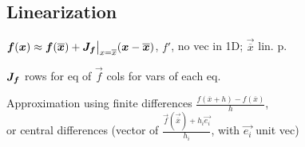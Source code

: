 \subsection{Linearization}
$\bm{f}(\bm{x}) \approx \bm{f}(\bm{\overline{x}}) + \bm{J}_{\bm{f}} \big|_{x = \overline{x}}(\bm{x} - \bm{\overline{x}})$, $f'$, no vec in 1D; $\vec{\overline{x}}$ lin. p.

\shortdefinition[Jac.] $\bm{J}_{\bm{f}}$ rows for eq of $\vec{f}$ cols for vars of each eq.

Approximation using finite differences $\frac{f(\overline{x} + h) - f(\overline{x})}{h}$,\\
or central differences (vector of $\frac{\vec{f}(\vec{\overline{x}}) + h_i \vec{e_i}}{h_i}$, with $\vec{e_i}$ unit vec)
